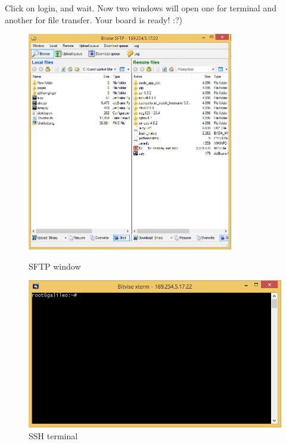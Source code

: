\documentclass[11pt,a4paper]{article}
\begin{document}
Click on login, and wait. Now two windows will open one for terminal and another for file transfer.
Your board is ready! :?)
\begin{figure}
  \includegraphics[width=9cm]{5.png}
  \caption{SFTP window}
    \includegraphics[width=\linewidth]{6.png}
  \caption{SSH terminal}
\end{figure}

	\newpage
     
\end{document}
